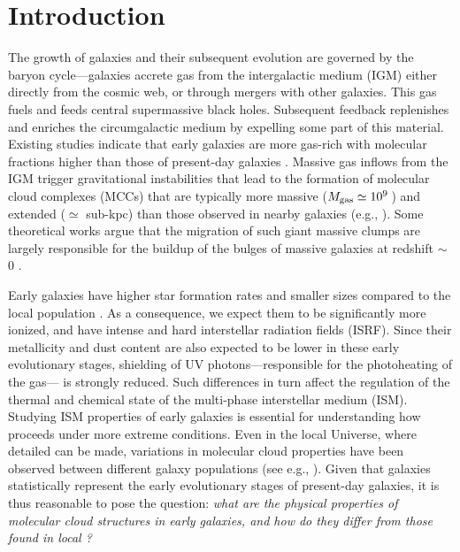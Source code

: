 \IfFileExists{emulateapjlegacy.cls}{\documentclass[iop]{emulateapjlegacy}}{\documentclass[iop]{emulateapj}}
\newcommand{\DL}[1]{({\bf \color{dlcolor} DL: #1})}
\newcommand{\MM}[1]{({\bf \color{mmcolor} MM: #1})}
\begin{document}
\section{Introduction}
The growth of galaxies and their subsequent evolution are governed by the baryon cycle---galaxies accrete gas from the intergalactic medium (IGM) either directly from the cosmic web, or through mergers with other galaxies. This gas fuels \SF and feeds central
supermassive black holes. Subsequent feedback replenishes and enriches the circumgalactic medium by expelling some
part of this material.
Existing studies indicate that early galaxies are more gas-rich with molecular fractions higher than
those of present-day galaxies \citep[e.g.,][]{vandevoort11b, Decarli16a, Decarli17a}. 
Massive gas inflows from the IGM trigger gravitational instabilities that lead to the formation of molecular cloud complexes (MCCs)
that are typically more massive ($M_{\rm gas}\simeq 10^9$\,\Msun) and extended ($\simeq$ sub-kpc) than those observed in nearby galaxies (e.g., \citealt{Gabor13a, Hopkins14a, Inoue16a}).
Some theoretical works argue that the migration of such giant massive clumps are largely responsible for the buildup of the bulges of massive galaxies at redshift \z$\sim$\,0 \citep[e.g.,][]{Ceverino10a}.

Early galaxies have higher star formation rates \citep[SFR; ][]{Behroozi13b, Sparre15a, Maiolino15a, Dunlop17a} and smaller sizes \citep[e.g.,][]{Bouwens11a, Ono13a} compared to the local population \citep[see also a review by][]{Stark16a}.
%
As a consequence, we expect them to be significantly more ionized, and have intense and hard interstellar radiation fields (ISRF). Since their metallicity and dust content are also expected to be lower in these early evolutionary stages, shielding of UV photons---responsible for the photoheating of the gas---  is strongly reduced. Such differences in turn affect the regulation of the thermal and chemical state of the multi-phase interstellar medium (ISM). Studying ISM properties of early galaxies is essential for understanding how \SF proceeds under more extreme conditions.
%
Even in the local Universe, where detailed \obs can be made, variations in molecular cloud
properties have been observed between different galaxy populations (see e.g., \citealt{Hughes10a, Hughes13b}).  Given that \highz galaxies statistically represent the early evolutionary stages of present-day galaxies, it is thus reasonable to pose the question: 
{\it what are the physical properties of
molecular cloud structures in early galaxies, and how do they differ from those found in local \galpop?}
%
\end{document}
